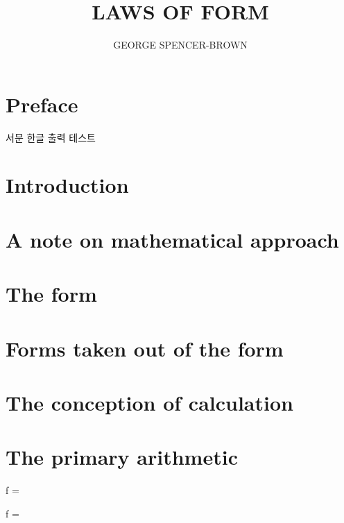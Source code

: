 \documentclass[11pt, a4paper]{book}
\title{LAWS OF FORM}
\author{GEORGE SPENCER-BROWN}
\begin{document}
\newpage
\maketitle

\tableofcontents

\newpage
{}
\section*{Preface}
서문 한글 출력 테스트

\newpage
{}
\section*{Introduction}

\newpage
{}
\section*{A note on mathematical approach}

\newpage
\section{The form}

\newpage
\section{Forms taken out of the form}

\newpage
\section{The conception of calculation}

\newpage
\section{The primary arithmetic}

\begin{form}
	f = 
\end{form}

\begin{form}
	f =  
\end{form}
\end{document}
